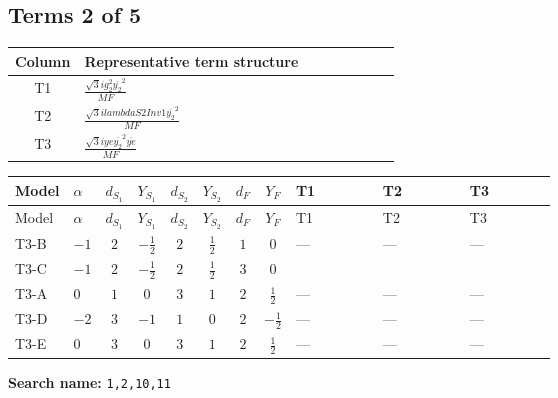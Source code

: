 \documentclass[8pt]{article}
\begin{document}
\begin{landscape}
\subsection*{Terms 2 of 5}
\begin{center}
\begin{tabular}{@{}c >{\raggedright\arraybackslash}p{0.82\linewidth}@{}}
\toprule
Column & Representative term structure \\
\midrule
T1 & \(\displaystyle \frac{\sqrt{3} i g_{2}^{2} \overline{y_{2}}^{2}}{MF}\) \\
\midrule
T2 & \(\displaystyle \frac{\sqrt{3} i lambdaS2Inv1 \overline{y_{2}}^{2}}{MF}\) \\
\midrule
T3 & \(\displaystyle \frac{\sqrt{3} i ye \overline{y_{2}}^{2} \overline{ye}}{MF}\) \\
\midrule
\bottomrule
\end{tabular}
\end{center}
\smallskip
\tiny
\begin{longtable}{@{}llcccccc >{\raggedright\arraybackslash}p{0.21\linewidth} >{\raggedright\arraybackslash}p{0.21\linewidth} >{\raggedright\arraybackslash}p{0.21\linewidth}@{}}
\toprule
Model & $\alpha$ & $d_{S_1}$ & $Y_{S_1}$ & $d_{S_2}$ & $Y_{S_2}$ & $d_F$ & $Y_F$ & T1 & T2 & T3 \\
\midrule
\endfirsthead
\toprule
Model & $\alpha$ & $d_{S_1}$ & $Y_{S_1}$ & $d_{S_2}$ & $Y_{S_2}$ & $d_F$ & $Y_F$ & T1 & T2 & T3 \\
\midrule
\endhead
T3-B & $-1$ & $2$ & $-\frac{1}{2}$ & $2$ & $\frac{1}{2}$ & $1$ & $0$ & --- & --- & --- \\
\midrule
T3-C & $-1$ & $2$ & $-\frac{1}{2}$ & $2$ & $\frac{1}{2}$ & $3$ & $0$ & \scriptsize\adjustbox{max width=\linewidth}{$\begin{gathered} \frac{\sqrt{3} i g_{2}^{2} \overline{y_{2}}^{2}}{8 MF}\end{gathered}$} & \scriptsize\adjustbox{max width=\linewidth}{$\begin{gathered} \frac{\sqrt{3} i lambdaS2Inv1 \overline{y_{2}}^{2}}{12 MF}\end{gathered}$} & \scriptsize\adjustbox{max width=\linewidth}{$\begin{gathered} - \frac{\sqrt{3} i ye \overline{y_{2}}^{2} \overline{ye}}{24 MF}\end{gathered}$} \\
\midrule
T3-A & $0$ & $1$ & $0$ & $3$ & $1$ & $2$ & $\frac{1}{2}$ & --- & --- & --- \\
\midrule
T3-D & $-2$ & $3$ & $-1$ & $1$ & $0$ & $2$ & $-\frac{1}{2}$ & --- & --- & --- \\
\midrule
T3-E & $0$ & $3$ & $0$ & $3$ & $1$ & $2$ & $\frac{1}{2}$ & --- & --- & --- \\
\midrule
\bottomrule
\end{longtable}
\clearpage
\noindent\textbf{Search name: }\texttt{1,2,10,11}\par\smallskip

\end{landscape}
\end{document}
